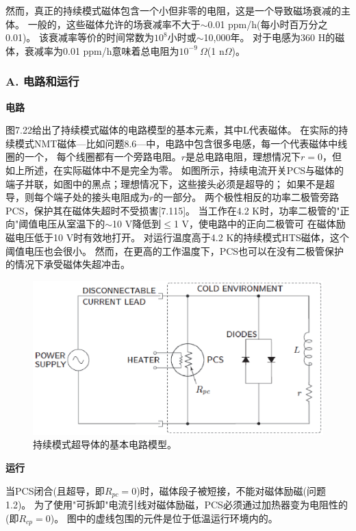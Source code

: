 然而，真正的持续模式磁体包含一个小但非零的电阻，这是一个导致磁场衰减的主体。
一般的，这些磁体允许的场衰减率不大于$\sim$0.01 ppm/h(每小时百万分之0.01)。
该衰减率等价的时间常数为$10^8$小时或$\sim$10,000年。
 对于电感为360 H的磁体，衰减率为0.01 ppm/h意味着总电阻为$10^{-9}\ \Omega$(1 n$\Omega$)。
 
\subsubsection*{A. 电路和运行}
\textbf{电路}

图7.22给出了持续模式磁体的电路模型的基本元素，其中L代表磁体。
在实际的持续模式NMT磁体---比如问题8.6---中，电路中包含很多电感，每一个代表磁体中线圈的一个，
每个线圈都有一个旁路电阻。$r$是总电路电阻，理想情况下$r = 0$，但如上所述，在实际磁体中不是完全为零。
如图所示，持续电流开关PCS与磁体的端子并联，如图中的黑点；理想情况下，这些接头必须是超导的；
如果不是超导，则每个端子处的接头电阻成为$r$的一部分。
两个极性相反的功率二极管旁路PCS，保护其在磁体失超时不受损害[7.115]。
当工作在4.2 K时，功率二极管的"正向"阈值电压从室温下的$\sim$10 V降低到$\le$1 V，使电路中的正向二极管可
在磁体励磁电压低于10 V时有效地打开。
对运行温度高于4.2 K的持续模式HTS磁体，这个阈值电压也会很小。
然而，在更高的工作温度下，PCS也可以在没有二极管保护的情况下承受磁体失超冲击。

\begin{figure}[htbp]
	\centering
	\includegraphics[scale=0.6]{chpt7/figs/fig7.22.eps}
	\caption{持续模式超导体的基本电路模型。}
\end{figure}

\textbf{运行}

当PCS闭合(且超导，即$R_{pc} = 0$)时，磁体段子被短接，不能对磁体励磁(问题1.2)。
为了使用"可拆卸"电流引线对磁体励磁，PCS必须通过加热器变为电阻性的(即$R_{cp} = 0$)。
图中的虚线包围的元件是位于低温运行环境内的。

